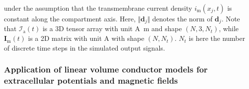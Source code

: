 under the assumption that the transmembrane current density $i_\mathrm{m}(x_j, t)$ is constant along the compartment axis. 
Here, $\Vert\mathbf{d}_j \Vert$ denotes the norm of $\mathbf{d}_j$. 
Note that $\mathcal{I}_\mathrm{a}(t)$ is a 3D tensor array with unit \si{\ampere \metre} and shape $(N, 3, N_t)$, 
while $\mathbf{I}_\mathrm{m}(t)$ is a 2D matrix with unit \si{A} with shape $(N, N_t)$. 
$N_t$ is here the number of discrete time steps in the simulated output signals.



\subsubsection{Application of linear volume conductor models for extracellular potentials and magnetic fields}

